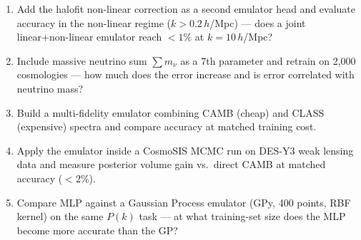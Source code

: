 \begin{enumerate}[leftmargin=1.6em,itemsep=0.2em,topsep=0.2em,label=Q\arabic*.]
\item Add the halofit non-linear correction as a second emulator head and evaluate accuracy in the non-linear regime ($k > 0.2\,h$/Mpc) --- does a joint linear+non-linear emulator reach $<1\%$ at $k=10\,h$/Mpc?
\item Include massive neutrino sum $\sum m_\nu$ as a 7th parameter and retrain on 2,000 cosmologies --- how much does the error increase and is error correlated with neutrino mass?
\item Build a multi-fidelity emulator combining CAMB (cheap) and CLASS (expensive) spectra and compare accuracy at matched training cost.
\item Apply the emulator inside a CosmoSIS MCMC run on DES-Y3 weak lensing data and measure posterior volume gain vs.\ direct CAMB at matched accuracy ($<2\%$).
\item Compare MLP against a Gaussian Process emulator (GPy, 400 points, RBF kernel) on the same $P(k)$ task --- at what training-set size does the MLP become more accurate than the GP?
\end{enumerate}


